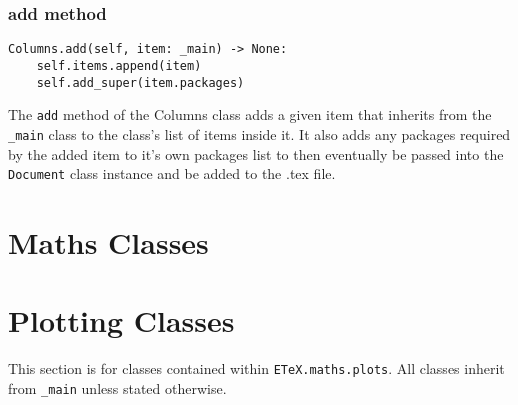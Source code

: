 \documentclass{article}
\begin{document}
\subsubsection[add method]{add method}
\begin{lstlisting}
Columns.add(self, item: _main) -> None:
	self.items.append(item)
	self.add_super(item.packages)
\end{lstlisting}
The \verb|add| method of the Columns class adds a given item that inherits from the \verb|_main| class to the class's list of items inside it. It also adds any packages required by the added item to it's own packages list to then eventually be passed into the \verb|Document| class instance and be added to the .tex file.
\section[Maths Classes]{Maths Classes}

\section[Plotting Classes]{Plotting Classes}
This section is for classes contained within \verb|ETeX.maths.plots|. All classes inherit from \verb|_main| unless stated otherwise.
\end{document}
